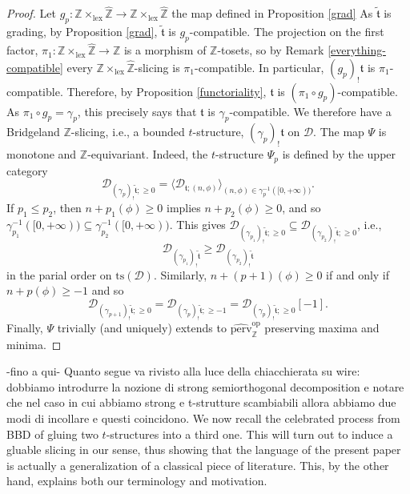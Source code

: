 \documentclass{article}
\theoremstyle{definition}
\newcommand{\Z}{\mathbb{Z}}
\newcommand{\ts}{\mathrm{ts}}
\newcommand{\tee}{\mathfrak{t}}
\begin{document}
\begin{proof}
Let $g_p\colon \mathbb{Z} \times_{\mathrm{lex}} \hat{\mathbb{Z}}\to \mathbb{Z} \times_{\mathrm{lex}} \hat{\mathbb{Z}}$ the map defined in Proposition \ref{grad}
As $\tilde{\tee}$ is grading, by Proposition \ref{grad}, $\tilde{\tee}$ is $g_p$-compatible. The projection on the first factor, $\pi_1\colon  \mathbb{Z} \times_{\mathrm{lex}} \hat{\mathbb{Z}}\to \Z$ is a morphism of $\Z$-tosets, so by Remark \ref{everything-compatible} every $\mathbb{Z} \times_{\mathrm{lex}} \hat{\mathbb{Z}}$-slicing is $\pi_1$-compatible. In particular, $(g_p)_!\tee$ is $\pi_1$-compatible. Therefore, by Proposition \ref{functoriality}, $\tee$ is $(\pi_1\circ g_p)$-compatible. As $\pi_1\circ g_p=\gamma_p$, this precisely says that $\tee$ is $\gamma_p$-compatible. We therefore have a Bridgeland $\Z$-slicing, i.e., a bounded $t$-structure, $(\gamma_p)_!\tee$ on $\mathscr{D}$. The map $\Psi$ is monotone and $\Z$-equivariant. Indeed, the $t$-structure $\Psi_p$ is defined by the upper category
\[
\mathscr{D}_{(\gamma_{p})_!\tilde{\tee};\geq 0}=\langle \mathscr{D}_{\tee;(n,\phi)}\rangle_{(n,\phi)\in \gamma_p^{-1}([0,+\infty))}.
\]
If $p_1\leq p_2$, then $n+p_1(\phi)\geq 0$ implies $n+p_2(\phi)\geq 0$, and so $\gamma_{p_1}^{-1}([0,+\infty))\subseteq \gamma_{p_2}^{-1}([0,+\infty))$. This gives $\mathscr{D}_{(\gamma_{p_1})_!\tilde{\tee};\geq 0}\subseteq \mathscr{D}_{(\gamma_{p_2})_!\tilde{\tee};\geq 0}$, i.e.,
\[
\mathscr{D}_{(\gamma_{p_1})_!\tilde{\tee}}\geq \mathscr{D}_{(\gamma_{p_2})_!\tilde{\tee}}
\]
in the parial order on  $\ts(\mathscr{D})$. Similarly, $n+(p+1)(\phi)\geq 0$ if and only if $n+p(\phi)\geq -1$ and so
\[
\mathscr{D}_{(\gamma_{p+1})_!\tilde{\tee};\geq 0}=\mathscr{D}_{(\gamma_{p})_!\tilde{\tee};\geq -1}=\mathscr{D}_{(\gamma_{p})_!\tilde{\tee};\geq 0}[-1].
\]
Finally, $\Psi$ trivially (and uniquely) extends to $\widehat{\mathrm{perv}}_\Z^{\mathrm{op}}$ preserving maxima and minima.
\end{proof}


{\Huge -fino a qui-}
{\color{red} Quanto segue va rivisto alla luce della chiacchierata su wire: dobbiamo introdurre la nozione di strong semiorthogonal decomposition e notare che nel caso in cui abbiamo strong e t-strutture scambiabili allora abbiamo due modi di incollare e questi coincidono.}
We now recall the celebrated process from {\color{red} BBD} of gluing two $t$-structures into a third one. This will turn out to induce a gluable slicing in our sense, thus showing that the language of the present paper is actually a generalization of a classical piece of literature. This, by the other hand, explains both our terminology and motivation.
\end{document}
